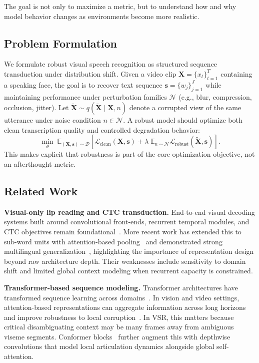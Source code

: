 \documentclass[10pt,twocolumn,letterpaper]{article}
\begin{document}
The goal is not only to maximize a metric, but to understand how and why model behavior changes as environments become more realistic.

\subsection{Problem Formulation}
We formulate robust visual speech recognition as structured sequence transduction under distribution shift. Given a video clip $\mathbf{X}=\{x_t\}_{t=1}^{T}$ containing a speaking face, the goal is to recover text sequence $\mathbf{s}=\{w_j\}_{j=1}^{J}$ while maintaining performance under perturbation families $\mathcal{N}$ (e.g., blur, compression, occlusion, jitter). Let $\tilde{\mathbf{X}} \sim q(\tilde{\mathbf{X}}\mid \mathbf{X}, n)$ denote a corrupted view of the same utterance under noise condition $n\in\mathcal{N}$. A robust model should optimize both clean transcription quality and controlled degradation behavior:
\begin{equation}
\min_{\theta}\; \mathbb{E}_{(\mathbf{X},\mathbf{s})\sim \mathcal{D}}
\left[\mathcal{L}_{\text{clean}}(\mathbf{X},\mathbf{s})
+ \lambda \; \mathbb{E}_{n\sim \mathcal{N}}
\mathcal{L}_{\text{robust}}(\tilde{\mathbf{X}},\mathbf{s})\right].
\end{equation}
This makes explicit that robustness is part of the core optimization objective, not an afterthought metric.

\subsection{Related Work}
\textbf{Visual-only lip reading and CTC transduction.}
End-to-end visual decoding systems built around convolutional front-ends, recurrent temporal modules, and CTC objectives remain foundational~\cite{assael2016lipnet,graves2006ctc}. More recent work has extended this to sub-word units with attention-based pooling~\cite{prajwal2022subword} and demonstrated strong multilingual generalization~\cite{ma2022multilingual}, highlighting the importance of representation design beyond raw architecture depth. Their weaknesses include sensitivity to domain shift and limited global context modeling when recurrent capacity is constrained.

\textbf{Transformer-based sequence modeling.}
Transformer architectures have transformed sequence learning across domains~\cite{vaswani2017attention}. In vision and video settings, attention-based representations can aggregate information across long horizons and improve robustness to local corruption~\cite{dosovitskiy2021vit,tong2022videomae}. In VSR, this matters because critical disambiguating context may be many frames away from ambiguous viseme segments. Conformer blocks~\cite{conformer2020} further augment this with depthwise convolutions that model local articulation dynamics alongside global self-attention.
\end{document}
